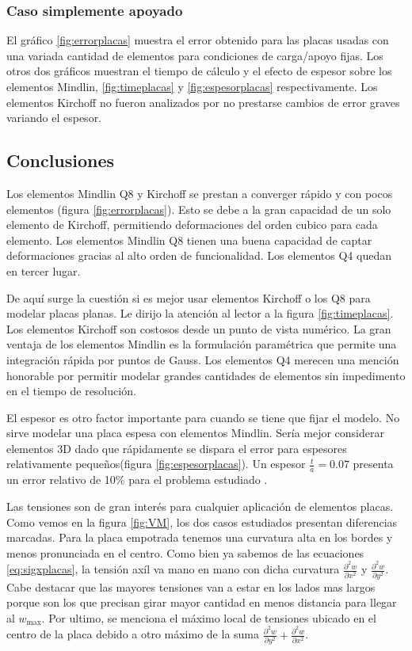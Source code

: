 \documentclass[onecolumn,10pt,titlepage]{article}
\begin{document}
\subsubsection*{Caso simplemente apoyado}
El gráfico \ref{fig:errorplacas} muestra el error obtenido para las placas usadas con una variada cantidad de elementos para condiciones de carga/apoyo fijas. Los otros dos gráficos muestran el tiempo de cálculo y el efecto de espesor sobre los elementos Mindlin, \ref{fig:timeplacas} y \ref{fig:espesorplacas} respectivamente. Los elementos Kirchoff no fueron analizados por no prestarse cambios de error graves variando el espesor.

\subsection{Conclusiones}
Los elementos Mindlin Q8 y Kirchoff se prestan a converger rápido y con pocos elementos (figura \ref{fig:errorplacas}). Esto se debe a la gran capacidad de un solo elemento de Kirchoff, permitiendo deformaciones del orden cubico para cada elemento. Los elementos Mindlin Q8 tienen una buena capacidad de captar deformaciones gracias al alto orden de funcionalidad. Los elementos Q4 quedan en tercer lugar. 

De aquí surge la cuestión si es mejor usar elementos Kirchoff o los Q8 para modelar placas planas. Le dirijo la atención al lector a la figura \ref{fig:timeplacas}. Los elementos Kirchoff son costosos desde un punto de vista numérico. La gran ventaja de los elementos Mindlin es la formulación paramétrica que permite una integración rápida por puntos de Gauss. Los elementos Q4 merecen una mención honorable por permitir modelar grandes cantidades de elementos sin impedimento en el tiempo de resolución. 

El espesor es otro factor importante para cuando se tiene que fijar el modelo. No sirve modelar una placa espesa con elementos Mindlin. Sería mejor considerar elementos 3D dado que rápidamente se dispara el error para espesores relativamente pequeños(figura \ref{fig:espesorplacas}). Un espesor $\frac{t}{a}=0.07$ presenta un error relativo de 10\% para el problema estudiado .

Las tensiones son de gran interés para cualquier aplicación de elementos placas. Como vemos en la figura \ref{fig:VM}, los dos casos estudiados presentan diferencias marcadas.  Para la placa empotrada tenemos una curvatura alta en los bordes y menos pronunciada en el centro. Como bien ya sabemos de las ecuaciones \eqref{eq:sigxplacas}, la tensión axíl va mano en mano con dicha curvatura $\frac{\partial^2 w}{\partial x^2}$ y $\frac{\partial^2 w}{\partial y^2}$. Cabe destacar que las mayores tensiones van a estar en los lados mas largos porque son los que precisan girar mayor cantidad en menos distancia para llegar al $w_{\max}$. Por ultimo, se menciona el máximo local de tensiones ubicado en el centro de la placa debido a otro máximo de la suma $\frac{\partial^2 w}{\partial y^2}+\frac{\partial^2 w}{\partial x^2}$.
\end{document}
